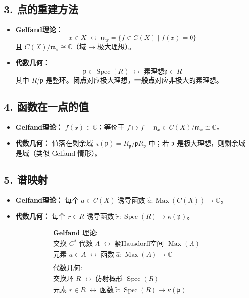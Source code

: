 \documentclass[10pt, openany]{book}
\begin{document}
\subsection*{3. 点的重建方法}
\begin{itemize}
    \item \textbf{Gelfand理论：} 
    \[
    x \in X \;\longleftrightarrow\; \mathfrak{m}_x = \{ f \in C(X) \mid f(x)=0 \}
    \]
    且 \(C(X)/\mathfrak{m}_x \cong \mathbb{C}\)（域 → 极大理想）。
    
    \item \textbf{代数几何：} 
    \[
    \mathfrak{p} \in \operatorname{Spec}(R) \;\longleftrightarrow\; \text{素理想} \mathfrak{p} \subset R
    \]
    其中 \(R/\mathfrak{p}\) 是整环。\textbf{闭点}对应极大理想，\textbf{一般点}对应非极大的素理想。
\end{itemize}

\subsection*{4. 函数在一点的值}
\begin{itemize}
    \item \textbf{Gelfand理论：} \(f(x) \in \mathbb{C}\)；等价于 \(f \mapsto f + \mathfrak{m}_x \in C(X)/\mathfrak{m}_x \cong \mathbb{C}\)。
    \item \textbf{代数几何：} 值落在剩余域 \(\kappa(\mathfrak{p}) = R_{\mathfrak{p}} / \mathfrak{p}R_{\mathfrak{p}}\) 中；若 \(\mathfrak{p}\) 是极大理想，则剩余域是域（类似 Gelfand 情形）。
\end{itemize}

\subsection*{5. 谱映射}
\begin{itemize}
    \item \textbf{Gelfand理论：} 每个 \(a \in C(X)\) 诱导函数 \(\hat{a} : \operatorname{Max}(C(X)) \to \mathbb{C}\)。
    \item \textbf{代数几何：} 每个 \(r \in R\) 诱导函数 \(\tilde{r} : \operatorname{Spec}(R) \to \kappa(\mathfrak{p})\)。
\end{itemize}

\[
\begin{array}{c}
\textbf{Gelfand 理论:}\\
\text{交换 } C^*\text{-代数 } A \;\longleftrightarrow\; \text{紧Hausdorff空间 } \operatorname{Max}(A)\\
\text{元素 } a \in A \;\longleftrightarrow\; \text{函数 } \hat{a} : \operatorname{Max}(A) \to \mathbb{C}\\
\\
\textbf{代数几何:}\\
\text{交换环 } R \;\longleftrightarrow\; \text{仿射概形 } \operatorname{Spec}(R)\\
\text{元素 } r \in R \;\longleftrightarrow\; \text{函数 } \tilde{r} : \operatorname{Spec}(R) \to \kappa(\mathfrak{p})
\end{array}
\]
\end{document}
